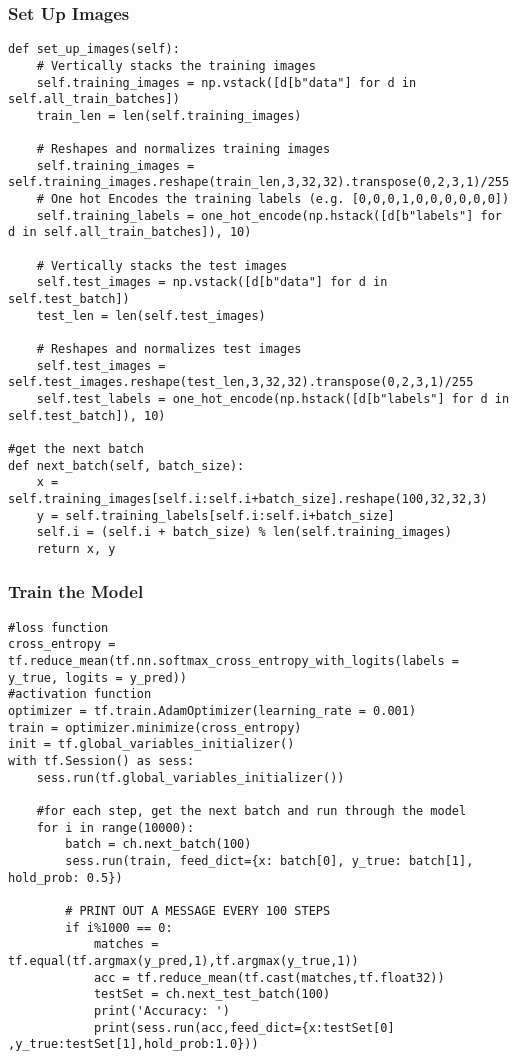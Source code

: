 \tocless\subsubsection{Set Up Images}
\begin{lstlisting}[style=Python]
def set_up_images(self):
    # Vertically stacks the training images
    self.training_images = np.vstack([d[b"data"] for d in self.all_train_batches])
    train_len = len(self.training_images)
    
    # Reshapes and normalizes training images
    self.training_images = self.training_images.reshape(train_len,3,32,32).transpose(0,2,3,1)/255
    # One hot Encodes the training labels (e.g. [0,0,0,1,0,0,0,0,0,0])
    self.training_labels = one_hot_encode(np.hstack([d[b"labels"] for d in self.all_train_batches]), 10)

    # Vertically stacks the test images
    self.test_images = np.vstack([d[b"data"] for d in self.test_batch])
    test_len = len(self.test_images)
    
    # Reshapes and normalizes test images
    self.test_images = self.test_images.reshape(test_len,3,32,32).transpose(0,2,3,1)/255
    self.test_labels = one_hot_encode(np.hstack([d[b"labels"] for d in self.test_batch]), 10)
    
#get the next batch
def next_batch(self, batch_size):
    x = self.training_images[self.i:self.i+batch_size].reshape(100,32,32,3)
    y = self.training_labels[self.i:self.i+batch_size]
    self.i = (self.i + batch_size) % len(self.training_images)
    return x, y
\end{lstlisting}

\tocless\subsubsection{Train the Model}
\begin{lstlisting}[style=Python]
#loss function
cross_entropy = tf.reduce_mean(tf.nn.softmax_cross_entropy_with_logits(labels = y_true, logits = y_pred))
#activation function
optimizer = tf.train.AdamOptimizer(learning_rate = 0.001)
train = optimizer.minimize(cross_entropy)
init = tf.global_variables_initializer()
with tf.Session() as sess:
    sess.run(tf.global_variables_initializer())

    #for each step, get the next batch and run through the model
    for i in range(10000):
        batch = ch.next_batch(100)
        sess.run(train, feed_dict={x: batch[0], y_true: batch[1], hold_prob: 0.5})
        
        # PRINT OUT A MESSAGE EVERY 100 STEPS
        if i%1000 == 0:
            matches = tf.equal(tf.argmax(y_pred,1),tf.argmax(y_true,1))
            acc = tf.reduce_mean(tf.cast(matches,tf.float32))
            testSet = ch.next_test_batch(100)
            print('Accuracy: ')
            print(sess.run(acc,feed_dict={x:testSet[0] ,y_true:testSet[1],hold_prob:1.0}))
\end{lstlisting}

